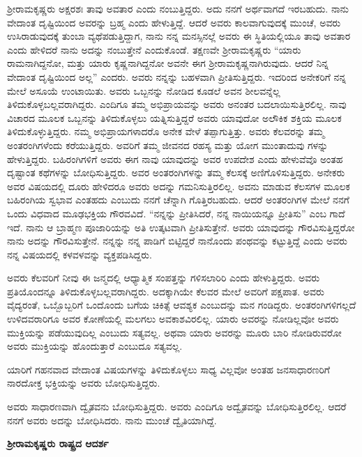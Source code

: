 ಶ‍್ರೀರಾಮಕೃಷ್ಣರು ಅಕ್ಷರಶಃ ತಾವು ಅವತಾರ ಎಂದು ನಂಬುತ್ತಿದ್ದರು. ಅದು ನನಗೆ ಅರ್ಥವಾಗದೆ ಇರಬಹುದು. ನಾನು ವೇದಾಂತ ದೃಷ್ಟಿಯಿಂದ ಅವರನ್ನು ಬ್ರಹ್ಮ ಎಂದು ಹೇಳುತ್ತಿದ್ದೆ. ಆದರೆ ಅವರು ಕಾಲವಾಗುವುದಕ್ಕೆ ಮುಂಚೆ, ಅವರು ಉಸಿರಾಡುವುದಕ್ಕೆ ತುಂಬಾ ವ್ಯಥೆಪಡುತ್ತಿದ್ದಾಗ, ನಾನು ನನ್ನ ಮನಸ್ಸಿನಲ್ಲೆ ಅವರು ಈ ಸ್ಥಿತಿಯಲ್ಲಿಯೂ ತಾವು ಅವತಾರ ಎಂದು ಹೇಳಿದರೆ ನಾನು ಅದನ್ನು ನಂಬುತ್ತೇನೆ ಎಂದುಕೊಂಡೆ. ತಕ್ಷಣವೇ ಶ‍್ರೀರಾಮಕೃಷ್ಣರು “ಯಾರು ರಾಮನಾಗಿದ್ದನೋ, ಮತ್ತು ಯಾರು ಕೃಷ್ಣನಾಗಿದ್ದನೋ ಅವನೇ ಈಗ ಶ‍್ರೀರಾಮಕೃಷ್ಣನಾಗಿರುವುದು. ಆದರೆ ನಿನ್ನ ವೇದಾಂತ ದೃಷ್ಟಿಯಿಂದ ಅಲ್ಲ” ಎಂದರು. ಅವರು ನನ್ನನ್ನು ಬಹಳವಾಗಿ ಪ್ರೀತಿಸುತ್ತಿದ್ದರು. ಇದರಿಂದ ಅನೇಕರಿಗೆ ನನ್ನ ಮೇಲೆ ಅಸೂಯೆ ಉಂಟಾಯಿತು. ಅವರು ಒಬ್ಬನನ್ನು ನೋಡಿದ ಕೂಡಲೆ ಅವನ ಶೀಲವನ್ನೆಲ್ಲ ತಿಳಿದುಕೊಳ್ಳಬಲ್ಲವರಾಗಿದ್ದರು. ಎಂದಿಗೂ ತಮ್ಮ ಅಭಿಪ್ರಾಯವನ್ನು ಅವರು ಅನಂತರ ಬದಲಾಯಿಸುತ್ತಿರಲಿಲ್ಲ. ನಾವು ವಿಚಾರದ ಮೂಲಕ ಒಬ್ಬನನ್ನು ತಿಳಿದುಕೊಳ್ಳಲು ಯತ್ನಿಸುತ್ತಿದ್ದರೆ ಅವರು ಯಾವುದೋ ಅಲೌಕಿಕ ಶಕ್ತಿಯ ಮೂಲಕ ತಿಳಿದುಕೊಳ್ಳುತ್ತಿದ್ದರು. ನಮ್ಮ ಅಭಿಪ್ರಾಯಗಳಾದರೊ ಅನೇಕ ವೇಳೆ ತಪ್ಪಾಗುತ್ತಿತ್ತು. ಅವರು ಕೆಲವರನ್ನು ತಮ್ಮ ಅಂತರಂಗಿಗಳೆಂದು ಕರೆಯುತ್ತಿದ್ದರು. ಅವರಿಗೆ ತಮ್ಮ ಜೀವನದ ರಹಸ್ಯ ಮತ್ತು ಯೋಗ ಮುಂತಾದುವು ಗಳನ್ನು ಹೇಳುತ್ತಿದ್ದರು. ಬಹಿರಂಗಿಗಳಿಗೆ ಅವರು ಈಗ ನಾವು ಯಾವುದನ್ನು ಅವರ ಉಪದೇಶ ಎಂದು ಹೇಳುವೆವೊ ಅಂತಹ ದೃಷ್ಟಾಂತ ಕಥೆಗಳನ್ನು ಬೋಧಿಸುತ್ತಿದ್ದರು. ಅವರ ಅಂತರಂಗಿಗಳನ್ನು ತಮ್ಮ ಕೆಲಸಕ್ಕೆ ಅಣಿಗೊಳಿಸುತ್ತಿದ್ದರು. ಅನೇಕರು ಅವರ ವಿಷಯದಲ್ಲಿ ದೂರು ಹೇಳಿದರೂ ಅವರು ಅದನ್ನು ಗಮನಿಸುತ್ತಿರಲಿಲ್ಲ. ಅವನು ಮಾಡುವ ಕೆಲಸಗಳ ಮೂಲಕ ಬಹಿರಂಗಿಯ ಸ್ವಭಾವ ಎಂತಹದು ಎಂಬುದು ನನಗೆ ಚೆನ್ನಾಗಿ ಗೊತ್ತಿರಬಹುದು. ಆದರೆ ಅಂತರಂಗಿಗಳ ಮೇಲೆ ನನಗೆ ಒಂದು ವಿಧವಾದ ಮೂಢಭಕ್ತಿಯ ಗೌರವವಿದೆ. “ನನ್ನನ್ನು ಪ್ರೀತಿಸಿದರೆ, ನನ್ನ ನಾಯಿಯನ್ನೂ ಪ್ರೀತಿಸು” ಎಂಬ ಗಾದೆ ಇದೆ. ನಾನು ಆ ಬ್ರಾಹ್ಮಣ ಪೂಜಾರಿಯನ್ನು ಅತಿ ಉತ್ಕಟವಾಗಿ ಪ್ರೀತಿಸುತ್ತೇನೆ. ಅವರು ಯಾವುದನ್ನು ಗೌರವಿಸುತ್ತಿದ್ದರೋ ನಾನು ಅದನ್ನು ಗೌರವಿಸುತ್ತೇನೆ. ನನ್ನನ್ನು ನನ್ನ ಪಾಡಿಗೆ ಬಿಟ್ಟಿದ್ದರೆ ನಾನೊಂದು ಪಂಥವನ್ನು ಕಟ್ಟುತ್ತಿದ್ದೆ ಎಂದು ಅವರು ನನ್ನ ವಿಷಯದಲ್ಲಿ ಕಳವಳವನ್ನು ವ್ಯಕ್ತಪಡಿಸಿದ್ದರು.

ಅವರು ಕೆಲವರಿಗೆ ನೀವು ಈ ಜನ್ಮದಲ್ಲಿ ಆಧ್ಯಾತ್ಮಿಕ ಸಂಪತ್ತನ್ನು ಗಳಿಸಲಾರಿರಿ ಎಂದು ಹೇಳುತ್ತಿದ್ದರು. ಅವರು ಪ್ರತಿಯೊಂದನ್ನೂ ತಿಳಿದುಕೊಳ್ಳಬಲ್ಲವರಾಗಿದ್ದರು. ಅದಕ್ಕಾಗಿಯೇ ಕೆಲವರ ಮೇಲೆ ಅವರಿಗೆ ಪಕ್ಷಪಾತ. ಅವರು ವೈದ್ಯರಂತೆ, ಒಬ್ಬೊಬ್ಬರಿಗೆ ಒಂದೊಂದು ಬಗೆಯ ಚಿಕಿತ್ಸೆ ಆವಶ್ಯಕ ಎಂಬುದನ್ನು ಮನ ಗಂಡಿದ್ದರು. ಅಂತರಂಗಿಗಳಿಗಲ್ಲದೆ ಉಳಿದವರಾರಿಗೂ ಅವರ ಕೋಣೆಯಲ್ಲಿ ಮಲಗಲು ಅವಕಾಶವಿರಲಿಲ್ಲ. ಯಾರು ಅವರನ್ನು ನೋಡಿಲ್ಲವೋ ಅವರು ಮುಕ್ತಿಯನ್ನು ಪಡೆಯುವುದಿಲ್ಲ ಎಂಬುದು ಸತ್ಯವಲ್ಲ. ಅಥವಾ ಯಾರು ಅವರನ್ನು ಮೂರು ಬಾರಿ ನೋಡಿರುವರೋ ಅವರು ಮುಕ್ತಿಯನ್ನು ಹೊಂದುತ್ತಾರೆ ಎಂಬುದೂ ಸತ್ಯವಲ್ಲ.

ಯಾರಿಗೆ ಗಹನವಾದ ವೇದಾಂತ ವಿಷಯಗಳನ್ನು ತಿಳಿದುಕೊಳ್ಳಲು ಸಾಧ್ಯ ವಿಲ್ಲವೋ ಅಂತಹ ಜನಸಾಧಾರಣರಿಗೆ ನಾರದೋಕ್ತ ಭಕ್ತಿಯನ್ನು ಅವರು ಬೋಧಿಸುತ್ತಿದ್ದರು.

ಅವರು ಸಾಧಾರಣವಾಗಿ ದ್ವೈತವನು ಬೋಧಿಸುತ್ತಿದ್ದರು. ಅವರು ಎಂದಿಗೂ ಅದ್ವೈತವನ್ನು ಬೋಧಿಸುತ್ತಿರಲಿಲ್ಲ. ಆದರೆ ನನಗೆ ಅವರು ಅದನ್ನು ಬೋಧಿಸಿದರು. ನಾನು ಮುಂಚೆ ದ್ವೈತಿಯಾಗಿದ್ದೆ.

\begin{center}
\textbf{ಶ‍್ರೀರಾಮಕೃಷ್ಣರು ರಾಷ್ಟ್ರದ ಆದರ್ಶ}
\end{center}

